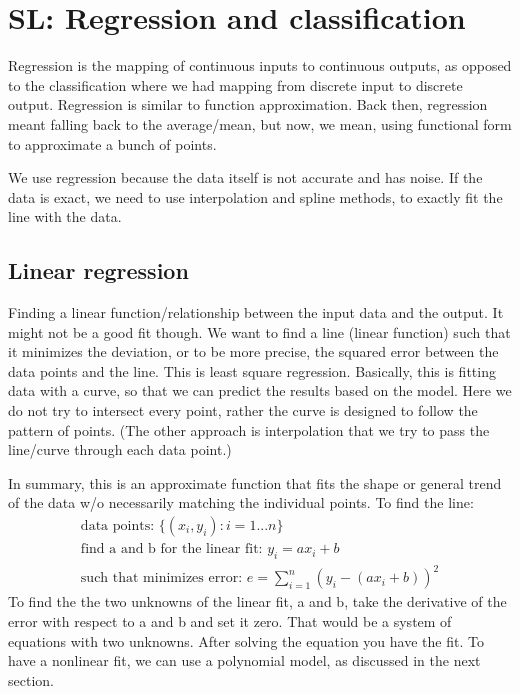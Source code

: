 \documentclass[12pt]{report}
\begin{document}
\section{SL: Regression and classification}

Regression is the mapping of continuous inputs to continuous outputs, as opposed to the classification where we had mapping from discrete input to discrete output. Regression is similar to function approximation. Back then, regression meant falling  back to the average/mean, but now, we mean, using functional form to approximate a bunch of points.

We use regression because the data itself is not accurate and has noise. If the data is exact, we need to use interpolation and spline methods, to exactly fit the line with the data.

\subsection{Linear regression}

Finding a linear function/relationship between the input data and the output. It might not be a good fit though. We want to find a line (linear function) such that it minimizes the deviation, or to be more precise, the squared error between the data points and the line. This is least square regression. Basically, this is fitting data with a curve, so that we can predict the results based on the model. Here we do not try to intersect every point, rather the curve is designed to follow the pattern of points. (The other approach is interpolation that we try to pass the line/curve through each data point.)

In summary, this is an approximate function that fits the shape or general trend of the data w/o necessarily matching the individual points.
To find the line:
\begin{equation}
	\begin{split}
	\text{data points:  } \{(x_i, y_i): i=1 ... n \} \\
	\text{find a and b for the linear fit:  } y_i = a x_i + b \\
	\text{such that minimizes error:  } e = \sum_{i=1}^n (y_i -(ax_i+b))^2
	\end{split}
\end{equation}
To find the the two unknowns of the linear fit, a and b, take the derivative of the error with respect to a and b and set it zero. That would be a system of equations with two unknowns. After solving the equation you have the fit. To have a nonlinear fit, we can use a polynomial model, as discussed in the next section.
\end{document}
